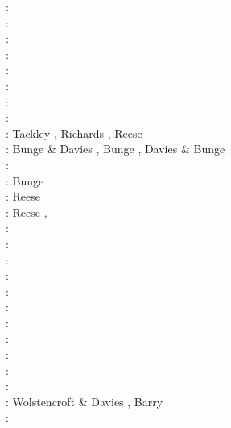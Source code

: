 \begin{itemize}
\begin{scriptsize}
\nineteeneightythree: \cite{baum83}\\
\nineteeneightyeight: \cite{glat88}\\
\nineteenninetythree: \cite{tasg93}\\
\nineteenninetyfour: \cite{tasg94}\\
\nineteenninetyfive: \cite{buba95}\\
\nineteenninetysix: \cite{buri96}\\
\nineteenninetyseven: \cite{burb97}\cite{yang97}\\
\nineteenninetyeight: \cite{burl98}\\
\nineteenninetynine: Tackley \etal \cite{tabg99}, Richards \etal \cite{ribr99}, 
                     Reese \etal \cite{resb99}\\
\twothousandone: Bunge \& Davies \cite{buda01}, Bunge \etal \cite{burm01}, Davies \& Bunge \cite{dabu01}\\
\twothousandtwo: \cite{burb02}\cite{strb02}\\
\twothousandthree: Bunge \etal \cite{buht03}\\
\twothousandfour: Reese \etal \cite{resb04}\\
\twothousandfive: Reese \etal \cite{resb05}, \cite{phbu05}\\
\twothousandsix: \cite{dabu06}\\
\twothousandseven: \cite{phbu07}\\
\twothousandeight: \cite{heib08}\cite{shlj08}\\
\twothousandnine: \cite{phbs09}\cite{wodd09}\cite{gows09}\cite{iabu09}\cite{scbs09}\cite{scbs09b}
\cite{scbr09}\cite{oebm09}\\
\twothousandten: \cite{yayh10}\\
\twothousandeleven: \cite{woda11}\cite{iahb11}\\
\twothousandtwelve: \cite{dagd12}\cite{shbs12}\\
\twothousandthirteen: \cite{dadb13}\cite{oflb13}\\
\twothousandfourteen: \cite{butm14}\\
\twothousandfifteen: \cite{amsb15}\cite{cobs15}\\
\twothousandsixteen: \cite{vade16}\cite{necg16}\cite{pric16}\\
\twothousandseventeen: Wolstencroft \& Davies \cite{woda17}, Barry \etal \cite{badw17} \\
\twothousandeighteen: \cite{ghbu18}\cite{cogb18}
\end{scriptsize}


\end{itemize}
